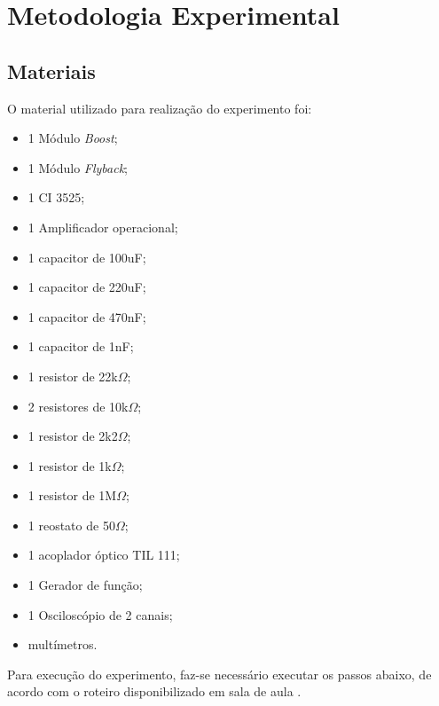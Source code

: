 \newpage
\section{Metodologia Experimental}

    \subsection{Materiais}
        O material utilizado para realização do experimento foi:

        \begin{itemize}
            \item 1 Módulo \textit{Boost};
            \item 1 Módulo \textit{Flyback};
            \item 1 CI 3525;
            \item 1 Amplificador operacional;
            \item 1 capacitor de 100uF;
            \item 1 capacitor de 220uF;
            \item 1 capacitor de 470nF;
            \item 1 capacitor de 1nF;
            \item 1 resistor de 22k$\Omega$;
            \item 2 resistores de 10k$\Omega$;
            \item 1 resistor de 2k2$\Omega$;
            \item 1 resistor de 1k$\Omega$;
            \item 1 resistor de 1M$\Omega$;
            \item 1 reostato de 50$\Omega$;
            \item 1 acoplador óptico TIL 111;
            \item 1 Gerador de função;
            \item 1 Osciloscópio de 2 canais;
            \item multímetros.
        \end{itemize}

        Para execução do experimento, faz-se necessário executar os passos abaixo, de acordo com o roteiro disponibilizado em sala de aula \cite{Roteiro}.
        
